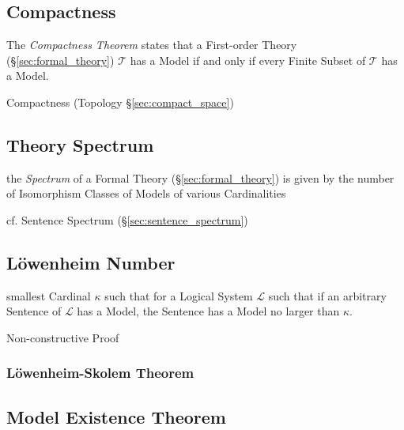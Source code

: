 \subsection{Compactness}\label{sec:compactness}

The \emph{Compactness Theorem} states that a First-order Theory
(\S\ref{sec:formal_theory}) $\mathcal{T}$ has a Model if and only if
every Finite Subset of $\mathcal{T}$ has a Model.

Compactness (Topology \S\ref{sec:compact_space})



\subsection{Theory Spectrum}\label{sec:theory_spectrum}

the \emph{Spectrum} of a Formal Theory (\S\ref{sec:formal_theory}) is given by
the number of Isomorphism Classes of Models of various Cardinalities

cf. Sentence Spectrum (\S\ref{sec:sentence_spectrum})



\subsection{L\"owenheim Number}\label{sec:lowenheim_number}

smallest Cardinal $\kappa$ such that for a Logical System
$\mathcal{L}$ such that if an arbitrary Sentence of $\mathcal{L}$ has
a Model, the Sentence has a Model no larger than $\kappa$.

Non-constructive Proof



\subsubsection{L\"owenheim-Skolem Theorem}\label{sec:lowenheim_skolem}



\subsection{Model Existence Theorem}\label{sec:model_existence}

